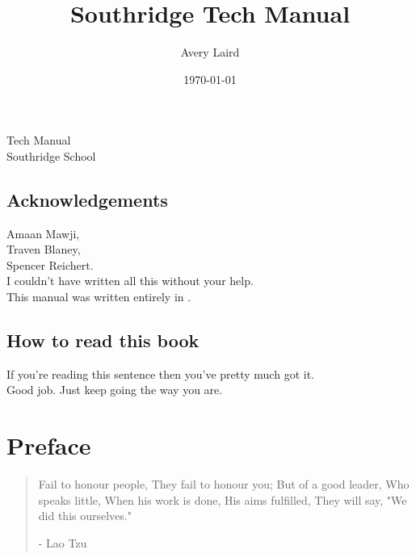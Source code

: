 \documentclass[letterpaper,10pt,oneside,headsepline]{scrreprt}
\author{Avery Laird}
\title{Southridge Tech Manual}
\date{\today}
\begin{document}
\pagestyle{empty}
\vspace*{7em} 
\begin{center}
\huge{Tech Manual}\\
\vspace*{1em} 
\large{Southridge School}
\end{center}
\clearpage
\pagestyle{scrheadings}
\tableofcontents
\newpage
\section{Acknowledgements}
Amaan Mawji, \\ Traven Blaney, \\ Spencer Reichert. \\ I couldn't have written all this without your help. \\ This manual was written entirely in \XeLaTeX. \\ 
\section{How to read this book}
If you're reading this sentence then you've pretty much got it. \\ Good job. Just keep going the way you are.

\chapter*{Preface}
\begin{flushleft}
\begin{quotation}
Fail to honour people,
They fail to honour you;
But of a good leader,
Who speaks little,
When his work is done,
His aims fulfilled,
They will say,
"We did this ourselves."

- Lao Tzu
\end{quotation}

\end{flushleft}
\end{document}
